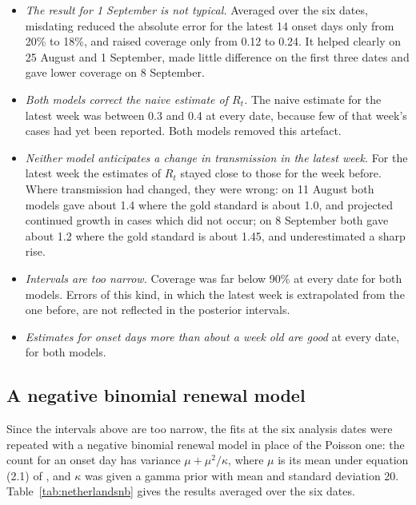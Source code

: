 \documentclass[11pt,a4paper]{article}
\begin{document}
\begin{itemize}[itemsep=2pt]
\item \emph{The result for 1 September is not typical.} Averaged over the six
dates, misdating reduced the absolute error for the latest 14 onset days only
from 20\% to 18\%, and raised coverage only from 0.12 to 0.24. It helped
clearly on 25 August and 1 September, made little difference on the first
three dates and gave lower coverage on 8 September.
\item \emph{Both models correct the naive estimate of $R_t$.} The naive
estimate for the latest week was between 0.3 and 0.4 at every date, because
few of that week's cases had yet been reported. Both models removed this
artefact.
\item \emph{Neither model anticipates a change in transmission in the latest
week.} For the latest week the estimates of $R_t$ stayed close to those for the
week before. Where transmission had changed, they were wrong: on 11 August both
models gave about 1.4 where the gold standard is about 1.0, and projected
continued growth in cases which did not occur; on 8 September both gave about
1.2 where the gold standard is about 1.45, and underestimated a sharp rise.
\item \emph{Intervals are too narrow.} Coverage was far below 90\% at every
date for both models. Errors of this kind, in which the latest week is
extrapolated from the one before, are not reflected in the posterior
intervals.
\item \emph{Estimates for onset days more than about a week old are good} at
every date, for both models.
\end{itemize}

\subsection{A negative binomial renewal model}

Since the intervals above are too narrow, the fits at the six analysis dates
were repeated with a negative binomial renewal model in place of the Poisson
one: the count for an onset day has variance $\mu+\mu^2/\kappa$, where $\mu$
is its mean under equation (2.1) of \cite{bajaj2025}, and $\kappa$ was given a
gamma prior with mean and standard deviation 20.
Table~\ref{tab:netherlandsnb} gives the results averaged over the six dates.
\end{document}
